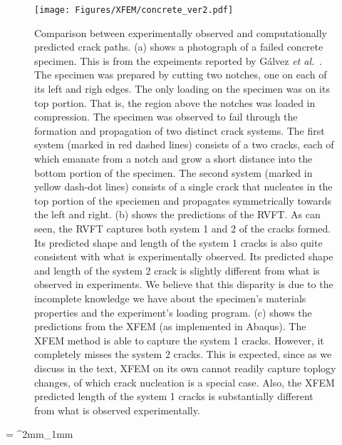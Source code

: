 \documentclass[10pt,letterpaper]{article}
\begin{document}
    \begin{figure}[ht!]
      \centering
      \texttt{[image: Figures/XFEM/concrete\_ver2.pdf]}
      \caption{Comparison between experimentally observed and computationally predicted crack paths. (a) shows a photograph of a failed concrete specimen. This is from the expeiments reported by G{\'a}lvez \textit{et al.}~\cite{galvez1999fracture}.   The specimen was prepared by  cutting two notches, one  on each of its   left and righ edges.  The only loading on the specimen was on its  top portion. That is,   the region above the notches was loaded in compression. The specimen was observed to fail through the formation and  propagation of two distinct crack systems.  The first system   (marked in red dashed lines)  consists  of a two cracks, each of which  emanate  from a  notch and  grow a short distance into the  bottom portion of the specimen. The second system (marked in yellow dash-dot lines) consists  of a single crack that nucleates in the top portion of the speciemen and propagates symmetrically towards the left and right.  (b) shows the predictions of the RVFT.  As can  seen, the    RVFT captures both system 1 and 2 of the cracks formed. Its predicted shape and length of the  system 1 cracks is also quite consistent with what is experimentally observed.  Its  predicted shape and length of the system 2 crack is  slightly different from what is observed in experiments. We believe that this disparity is due to the incomplete knowledge we have about the specimen's materials properties and the experiment's loading program. (c) shows the predictions from the XFEM (as implemented in Abaqus). The XFEM method is able to capture the system 1 cracks. However, it completely misses the  system 2 cracks. This is expected, since as we discuss in the text, XFEM on its own cannot readily capture  toplogy changes, of which crack nucleation is a special case. Also, the XFEM predicted length of the  system 1 cracks is substantially  different from what is observed experimentally. }
      \label{f:xfem}
\end{figure}

%
\tabulinesep = ^2mm_1mm
\everyrow{\tabucline[.4mm  white]{}}
\end{document}
